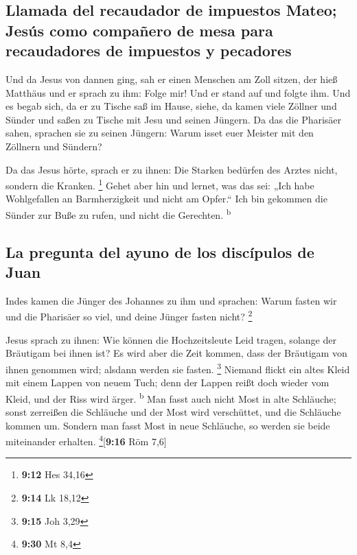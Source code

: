 \hypertarget{llamada-del-recaudador-de-impuestos-mateo-jesuxfas-como-compauxf1ero-de-mesa-para-recaudadores-de-impuestos-y-pecadores}{%
\subsection{Llamada del recaudador de impuestos Mateo; Jesús como
compañero de mesa para recaudadores de impuestos y
pecadores}\label{llamada-del-recaudador-de-impuestos-mateo-jesuxfas-como-compauxf1ero-de-mesa-para-recaudadores-de-impuestos-y-pecadores}}

 Und da Jesus von dannen ging, sah er einen Menschen am
Zoll sitzen, der hieß Matthäus und er sprach zu ihm: Folge mir! Und er
stand auf und folgte ihm.  Und es begab sich, da er zu
Tische saß im Hause, siehe, da kamen viele Zöllner und Sünder und saßen
zu Tische mit Jesu und seinen Jüngern.  Da das die
Pharisäer sahen, sprachen sie zu seinen Jüngern: Warum isset euer
Meister mit den Zöllnern und Sündern?

 Da das Jesus hörte, sprach er zu ihnen: Die Starken
bedürfen des Arztes nicht, sondern die Kranken. \footnote{\textbf{9:12}
  Hes 34,16}  Gehet aber hin und lernet, was das sei:
„Ich habe Wohlgefallen an Barmherzigkeit und nicht am Opfer.`` Ich bin
gekommen die Sünder zur Buße zu rufen, und nicht die Gerechten.
\textsuperscript{b}

\hypertarget{la-pregunta-del-ayuno-de-los-discuxedpulos-de-juan}{%
\subsection{La pregunta del ayuno de los discípulos de
Juan}\label{la-pregunta-del-ayuno-de-los-discuxedpulos-de-juan}}

 Indes kamen die Jünger des Johannes zu ihm und sprachen:
Warum fasten wir und die Pharisäer so viel, und deine Jünger fasten
nicht? \footnote{\textbf{9:14} Lk 18,12}

 Jesus sprach zu ihnen: Wie können die Hochzeitsleute
Leid tragen, solange der Bräutigam bei ihnen ist? Es wird aber die Zeit
kommen, dass der Bräutigam von ihnen genommen wird; alsdann werden sie
fasten. \footnote{\textbf{9:15} Joh 3,29}  Niemand flickt
ein altes Kleid mit einem Lappen von neuem Tuch; denn der Lappen reißt
doch wieder vom Kleid, und der Riss wird ärger. \textsuperscript{b}
 Man fasst auch nicht Most in alte Schläuche; sonst
zerreißen die Schläuche und der Most wird verschüttet, und die Schläuche
kommen um. Sondern man fasst Most in neue Schläuche, so werden sie beide
miteinander erhalten. \footnote{\textbf{9:30} Mt 8,4}{[}\textbf{9:16}
Röm 7,6{]}

